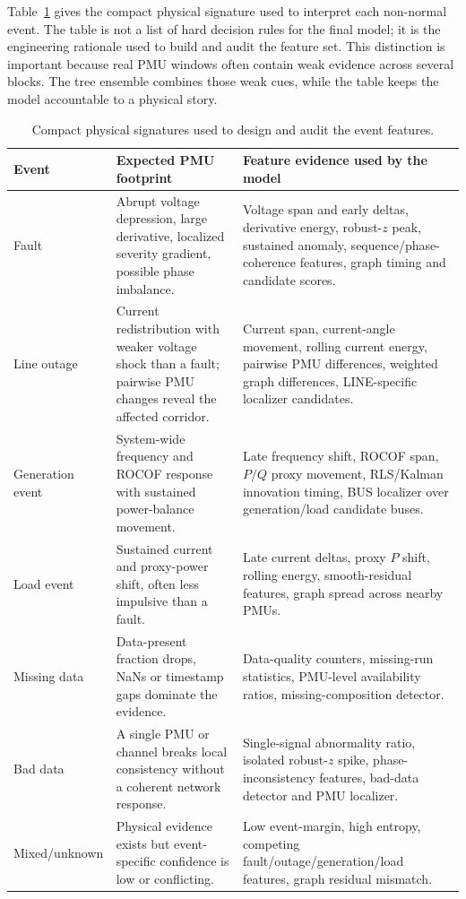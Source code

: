 \documentclass[conference]{IEEEtran}
\begin{document}
Table~\ref{tab:eventsignatures} gives the compact physical signature used to interpret each non-normal event. The table is not a list of hard decision rules for the final model; it is the engineering rationale used to build and audit the feature set. This distinction is important because real PMU windows often contain weak evidence across several blocks. The tree ensemble combines those weak cues, while the table keeps the model accountable to a physical story.

\begin{table}[t]
\centering
\caption{Compact physical signatures used to design and audit the event features.}
\label{tab:eventsignatures}
\renewcommand{\arraystretch}{1.08}
\footnotesize
\begin{tabular}{@{}p{}p{}p{}@{}}
\toprule
\textbf{Event} & \textbf{Expected PMU footprint} & \textbf{Feature evidence used by the model} \\
\midrule
Fault & Abrupt voltage depression, large derivative, localized severity gradient, possible phase imbalance. & Voltage span and early deltas, derivative energy, robust-$z$ peak, sustained anomaly, sequence/phase-coherence features, graph timing and candidate scores. \\
Line outage & Current redistribution with weaker voltage shock than a fault; pairwise PMU changes reveal the affected corridor. & Current span, current-angle movement, rolling current energy, pairwise PMU differences, weighted graph differences, LINE-specific localizer candidates. \\
Generation event & System-wide frequency and ROCOF response with sustained power-balance movement. & Late frequency shift, ROCOF span, $P/Q$ proxy movement, RLS/Kalman innovation timing, BUS localizer over generation/load candidate buses. \\
Load event & Sustained current and proxy-power shift, often less impulsive than a fault. & Late current deltas, proxy $P$ shift, rolling energy, smooth-residual features, graph spread across nearby PMUs. \\
Missing data & Data-present fraction drops, NaNs or timestamp gaps dominate the evidence. & Data-quality counters, missing-run statistics, PMU-level availability ratios, missing-composition detector. \\
Bad data & A single PMU or channel breaks local consistency without a coherent network response. & Single-signal abnormality ratio, isolated robust-$z$ spike, phase-inconsistency features, bad-data detector and PMU localizer. \\
Mixed/unknown & Physical evidence exists but event-specific confidence is low or conflicting. & Low event-margin, high entropy, competing fault/outage/generation/load features, graph residual mismatch. \\
\bottomrule
\end{tabular}
\end{table}
\end{document}
